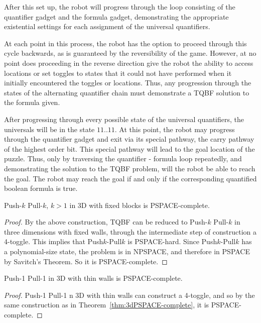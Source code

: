 After this set up, the robot will progress through the loop consisting of the quantifier gadget and the
formula gadget, demonstrating the appropriate existential settings for each assignment of the universal
quantifiers.

At each point in this process, the robot has the option to proceed through this cycle backwards, as is
guaranteed by the reversibility of the game. However, at no point does proceeding in the reverse direction
give the robot the ability to access locations or set toggles to states that it could not have performed
when it initially encountered the toggles or locations. Thus, any progression through the states of the
alternating quantifier chain must demonstrate a TQBF solution to the formula given.

After progressing through every possible state of the universal quantifiers, the universals will be in the
state $11 .. 11$. At this point, the robot may progress through the quantifier gadget and exit via its special
pathway,
the carry pathway of the highest order bit. This special pathway will lead to the goal location of the puzzle.
Thus, only by traversing the quantifier - formula loop repeatedly, and demonstrating the solution to the TQBF
problem,
will the robot be able to reach the goal. The robot may reach the goal if and only if the corresponding quantified
boolean formula is true.

\begin{theorem}
    \label{thm:3dPSPACE-complete}
    Push-$k$ Pull-$k$, $k>1$ in 3D with fixed blocks is PSPACE-complete.
\end{theorem}
\begin{proof}
By the above construction, TQBF can be reduced to Push-$k$ Pull-$k$ in three dimensions with fixed walls, through the intermediate step of construction a 4-toggle. This implies that Push$k$-Pull$k$ is PSPACE-hard.
Since Push$k$-Pull$k$ has a polynomial-size state, the problem is in NPSPACE, and therefore in PSPACE by Savitch's Theorem\cite{SAVITCH1970177}. So it is PSPACE-complete.
\end{proof}

\begin{theorem}
    Push-1 Pull-1 in 3D with thin walls is PSPACE-complete.
\end{theorem}
\begin{proof}
    Push-1 Pull-1 n 3D with thin walls can construct a 4-toggle, and so by the same construction as in Theorem~\ref{thm:3dPSPACE-complete}, it is PSPACE-complete.
\end{proof}
